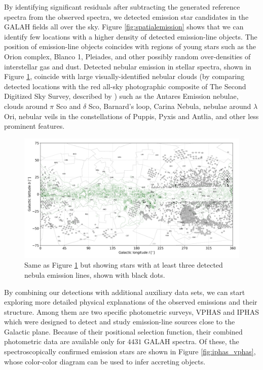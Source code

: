 By identifying significant residuals after subtracting the generated reference spectra from the observed spectra, we detected emission star candidates in the GALAH fields all over the sky. Figure \ref{fig:spatialemission} shows that we can identify few locations with a higher density of detected emission-line objects. The position of emission-line objects coincides with regions of young stars such as the Orion complex, Blanco 1, Pleiades, and other possibly random over-densities of interstellar gas and dust. Detected nebular emission in stellar spectra, shown in Figure \ref{fig:spatialnebular}, coincide with large visually-identified nebular clouds (by comparing detected locations with the red all-sky photographic composite of The Second Digitized Sky Survey, described by \citet{2000ASPC..216..145M}) such as the Antares Emission nebulae, clouds around $\pi$ Sco and $\delta$ Sco, Barnard's loop, Carina Nebula, nebulae around $\lambda$ Ori, nebular veils in the constellations of Puppis, Pyxis and Antlia, and other less prominent features.

\begin{figure}
	\centering
	\includegraphics[width=\textwidth]{reddening_d2000_n720_cont_wnebular.png}
	\caption{Same as Figure \ref{fig:spatialnebular} but showing stars with at least three detected nebula emission lines, shown with black dots.}
	\label{fig:spatialnebular}
\end{figure}

By combining our detections with additional auxiliary data sets, we can start exploring more detailed physical explanations of the observed emissions and their structure. Among them are two specific photometric surveys, VPHAS \cite{2014MNRAS.440.2036D} and IPHAS \cite{2008MNRAS.384.1277W} which were designed to detect and study emission-line sources close to the Galactic plane. Because of their positional selection function, their combined photometric data are available only for $4431$ GALAH spectra. Of these, the spectroscopically confirmed emission stars are shown in Figure \ref{fig:iphas_vphas}, whose color-color diagram can be used to infer accreting objects.

